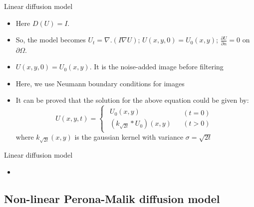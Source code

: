 \documentclass{beamer}
\begin{document}
\begin{frame}{Linear diffusion model}{}
  \begin{itemize}
  \item {
    Here $D\left(U\right)=I$.
    \pause
  }
  \item {
    So, the model becomes $U_{t}=\nabla.\left(I\nabla U\right)$; $U\left(x,y,0\right)=U_{0}\left(x,y\right)$;
$\frac{\partial U}{\partial n}=0$ on $\partial\Omega$.
    \pause
  }
  \item {
    $U\left(x,y,0\right)=U_{0}\left(x,y\right)$. It is the noise-added image before filtering
    \pause
  }
  \item {
    Here, we use Neumann boundary conditions for images
    \pause
  }
  \item {
    It can be proved that the solution for the above equation could be given by: \[
U\left(x,y,t\right)=\begin{cases}
\begin{array}{c}
U_{0}\left(x,y\right)\\
(k_{\sqrt{2t}}*U_{0})\left(x,y\right)
\end{array} & \begin{array}{c}
\left(t=0\right)\\
\left(t>0\right)
\end{array}\end{cases}
\] where $k_{\sqrt{2t}}\left(x,y\right)$ is the gaussian kernel with variance $\sigma=\sqrt{2t}$
  }
  \end{itemize}
\end{frame}

\begin{frame}{Linear diffusion model}
    \begin{itemize}
    \item {}
    \end{itemize}
\end{frame}

\subsection{Non-linear Perona-Malik diffusion model}
\end{document}
